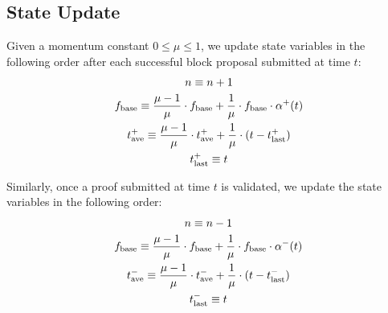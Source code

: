 \documentclass[9pt,oneside]{amsart}
\begin{document}
\begin{multicols}{2}
\subsection{State Update}
Given a momentum constant $ 0\leq \mu \leq 1$, we update state variables in the following order after each successful block proposal submitted at time $t$:
\begin{gather}
    n \equiv n + 1\\
f_\textnormal{base} \equiv 
\frac{\mu-1}{\mu} \cdot f_\textnormal{base} + \frac{1}{\mu} \cdot f_\textnormal{base}\cdot \alpha^+(t)
\\
t^+_\textnormal{ave} \equiv 
\frac{\mu-1}{\mu} \cdot t^+_\textnormal{ave} + \frac{1}{\mu} \cdot (t-t^+_\textnormal{last})
\\
t^+_\textnormal{last} \equiv t
\end{gather}

Similarly, once a proof submitted at time $t$ is validated, we update the state variables in the following order:
\begin{gather}
    n \equiv n - 1
\\
f_\textnormal{base} \equiv
\frac{\mu-1}{\mu} \cdot f_\textnormal{base} + \frac{1}{\mu} \cdot f_\textnormal{base} \cdot \alpha^-(t)
\\
t^-_\textnormal{ave} \equiv 
\frac{\mu-1}{\mu} \cdot t^-_\textnormal{ave} + \frac{1}{\mu} \cdot (t-t^-_\textnormal{last})
\\
t^-_\textnormal{last} \equiv t
\end{gather}


\end{multicols}
\end{document}
